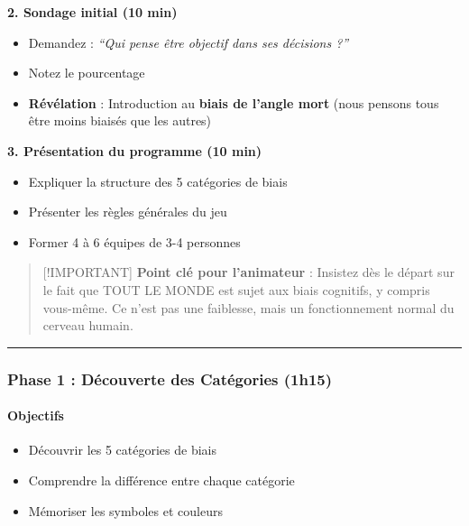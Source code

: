 \documentclass[
]{article}
\providecommand{\tightlist}{%
  \setlength{\itemsep}{0pt}\setlength{\parskip}{0pt}}
\begin{document}
\textbf{2. Sondage initial (10 min)}

\begin{itemize}
\tightlist
\item
  Demandez : \emph{``Qui pense être objectif dans ses décisions ?''}
\item
  Notez le pourcentage
\item
  \textbf{Révélation} : Introduction au \textbf{biais de l'angle mort}
  (nous pensons tous être moins biaisés que les autres)
\end{itemize}

\textbf{3. Présentation du programme (10 min)}

\begin{itemize}
\tightlist
\item
  Expliquer la structure des 5 catégories de biais
\item
  Présenter les règles générales du jeu
\item
  Former 4 à 6 équipes de 3-4 personnes
\end{itemize}

\begin{quote}
{[}!IMPORTANT{]} \textbf{Point clé pour l'animateur} : Insistez dès le
départ sur le fait que TOUT LE MONDE est sujet aux biais cognitifs, y
compris vous-même. Ce n'est pas une faiblesse, mais un fonctionnement
normal du cerveau humain.
\end{quote}

\begin{center}\rule{0.5\linewidth}{0.5pt}\end{center}

\subsubsection{\texorpdfstring{\textbf{Phase 1 : Découverte des
Catégories
(1h15)}}{Phase 1 : Découverte des Catégories (1h15)}}\label{phase-1-duxe9couverte-des-catuxe9gories-1h15}

\paragraph{Objectifs}\label{objectifs-1}

\begin{itemize}
\tightlist
\item
  Découvrir les 5 catégories de biais
\item
  Comprendre la différence entre chaque catégorie
\item
  Mémoriser les symboles et couleurs
\end{itemize}
\end{document}
